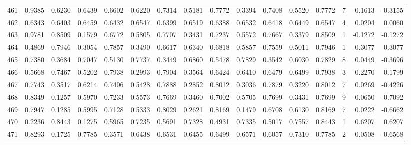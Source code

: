 \begin{tabular}{lrrrrrrrrrrrrrrr}
461 &      0.9385 &  0.6230 &  0.6439 &  0.6602 &  0.6220 &  0.7314 &  0.5181 &  0.7772 &  0.3394 &  0.7408 &   0.5520 &     0.7772 &      7 &                   -0.1613 &                    -0.3155 \\
462 &      0.6343 &  0.6403 &  0.6459 &  0.6432 &  0.6547 &  0.6399 &  0.6519 &  0.6388 &  0.6532 &  0.6418 &   0.6449 &     0.6547 &      4 &                    0.0204 &                     0.0060 \\
463 &      0.9781 &  0.8509 &  0.1579 &  0.6772 &  0.5805 &  0.7707 &  0.3431 &  0.7237 &  0.5572 &  0.7667 &   0.3379 &     0.8509 &      1 &                   -0.1272 &                    -0.1272 \\
464 &      0.4869 &  0.7946 &  0.3054 &  0.7857 &  0.3490 &  0.6617 &  0.6340 &  0.6818 &  0.5857 &  0.7559 &   0.5011 &     0.7946 &      1 &                    0.3077 &                     0.3077 \\
465 &      0.7380 &  0.3684 &  0.7047 &  0.5130 &  0.7737 &  0.3449 &  0.6860 &  0.5478 &  0.7829 &  0.3542 &   0.6030 &     0.7829 &      8 &                    0.0449 &                    -0.3696 \\
466 &      0.5668 &  0.7467 &  0.5202 &  0.7938 &  0.2993 &  0.7904 &  0.3564 &  0.6424 &  0.6410 &  0.6479 &   0.6499 &     0.7938 &      3 &                    0.2270 &                     0.1799 \\
467 &      0.7743 &  0.3517 &  0.6214 &  0.7406 &  0.5428 &  0.7888 &  0.2852 &  0.8012 &  0.3036 &  0.7879 &   0.3220 &     0.8012 &      7 &                    0.0269 &                    -0.4226 \\
468 &      0.8349 &  0.1257 &  0.5970 &  0.7233 &  0.5573 &  0.7669 &  0.3460 &  0.7002 &  0.5705 &  0.7699 &   0.3431 &     0.7699 &      9 &                   -0.0650 &                    -0.7092 \\
469 &      0.7947 &  0.1285 &  0.5995 &  0.7128 &  0.5333 &  0.8029 &  0.2621 &  0.8169 &  0.1479 &  0.6708 &   0.6130 &     0.8169 &      7 &                    0.0222 &                    -0.6662 \\
470 &      0.2236 &  0.8443 &  0.1275 &  0.5965 &  0.7235 &  0.5691 &  0.7328 &  0.4931 &  0.7335 &  0.5017 &   0.7557 &     0.8443 &      1 &                    0.6207 &                     0.6207 \\
471 &      0.8293 &  0.1725 &  0.7785 &  0.3571 &  0.6438 &  0.6531 &  0.6455 &  0.6499 &  0.6571 &  0.6057 &   0.7310 &     0.7785 &      2 &                   -0.0508 &                    -0.6568 \\

\end{tabular}
